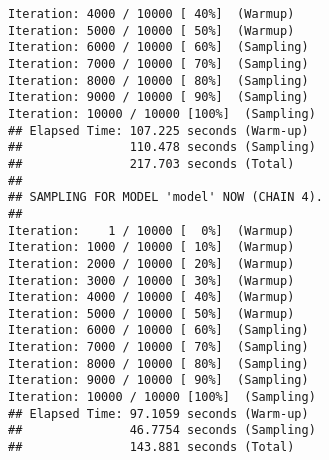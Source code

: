 \documentclass{article}\usepackage[]{graphicx}\usepackage[]{color}
\makeatletter
\newenvironment{kframe}{%
 \def\at@end@of@kframe{}%
 \ifinner\ifhmode%
  \def\at@end@of@kframe{\end{minipage}}%
  \begin{minipage}{\columnwidth}%
 \fi\fi%
 \def\FrameCommand##1{\hskip\@totalleftmargin \hskip-\fboxsep
 \colorbox{shadecolor}{##1}\hskip-\fboxsep
     \hskip-\linewidth \hskip-\@totalleftmargin \hskip\columnwidth}%
 \MakeFramed {\advance\hsize-\width
   \@totalleftmargin\z@ \linewidth\hsize
   \@setminipage}}%
 {\par\unskip\endMakeFramed%
 \at@end@of@kframe}
\newenvironment{knitrout}{}{} %
\makeatother
\begin{document}
\begin{knitrout}
\begin{kframe}
\begin{verbatim}
Iteration: 4000 / 10000 [ 40%]  (Warmup)
Iteration: 5000 / 10000 [ 50%]  (Warmup)
Iteration: 6000 / 10000 [ 60%]  (Sampling)
Iteration: 7000 / 10000 [ 70%]  (Sampling)
Iteration: 8000 / 10000 [ 80%]  (Sampling)
Iteration: 9000 / 10000 [ 90%]  (Sampling)
Iteration: 10000 / 10000 [100%]  (Sampling)
## Elapsed Time: 107.225 seconds (Warm-up)
##               110.478 seconds (Sampling)
##               217.703 seconds (Total)
## 
## SAMPLING FOR MODEL 'model' NOW (CHAIN 4).
## 
Iteration:    1 / 10000 [  0%]  (Warmup)
Iteration: 1000 / 10000 [ 10%]  (Warmup)
Iteration: 2000 / 10000 [ 20%]  (Warmup)
Iteration: 3000 / 10000 [ 30%]  (Warmup)
Iteration: 4000 / 10000 [ 40%]  (Warmup)
Iteration: 5000 / 10000 [ 50%]  (Warmup)
Iteration: 6000 / 10000 [ 60%]  (Sampling)
Iteration: 7000 / 10000 [ 70%]  (Sampling)
Iteration: 8000 / 10000 [ 80%]  (Sampling)
Iteration: 9000 / 10000 [ 90%]  (Sampling)
Iteration: 10000 / 10000 [100%]  (Sampling)
## Elapsed Time: 97.1059 seconds (Warm-up)
##               46.7754 seconds (Sampling)
##               143.881 seconds (Total)
\end{verbatim}
\end{kframe}
\end{knitrout}
\end{document}
